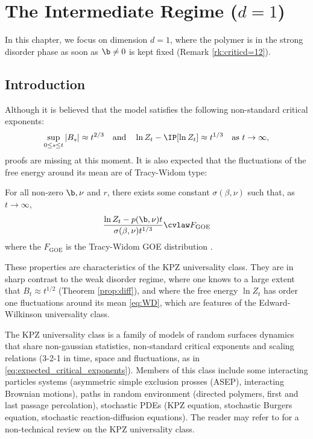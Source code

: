 \chapter{The Intermediate Regime ($d=1$)} \label{sec:IR}
In this chapter, we focus on dimension $d=1$, where the polymer is in the strong disorder phase as soon as $\b \neq 0$ is kept fixed (Remark \ref{rk:criticd=12}).
\section{Introduction}
Although it is believed that the model satisfies the following non-standard critical exponents: 
\begin{equation} \label{eq:expected_critical_exponents}
\sup_{0\leq s \leq t} |B_s| \approx t^{2/3} \quad \text{and} \quad \ln Z_t - \IP[\ln Z_t] \approx t^{1/3} \quad \text{as} \  t\to\infty,
\end{equation}
proofs are missing at this moment. It is also expected that the fluctuations of the free energy around its mean are of Tracy-Widom type:
\begin{conjecture} For all non-zero $\b,\nu$ and $r$, there exists some constant $\sigma(\beta,\nu)$ such that, as $t\to \infty$,
\begin{equation}
\frac{\ln Z_t-p(\b,\nu)t}{\sigma(\beta,\nu)t^{1/3}} \cvlaw F_{\mathrm{GOE}}
\end{equation}
where the $F_{\mathrm{GOE}}$ is the Tracy-Widom GOE distribution \textup{\cite{tracy1994level}}.
\end{conjecture}
These properties are characteristics of the KPZ universality class. They are in sharp contrast to the weak disorder regime, where one knows to a large extent that $B_t \approx t^{1/2}$ (Theorem \ref{prop:diff}), and where the free energy $\ln Z_t$ has order one fluctuations around its mean \eqref{eq:WD}, which are features of the Edward-Wilkinson universality class.

The KPZ universality class is a family of models of random surfaces dynamics that share non-gaussian statistics, non-standard critical exponents and scaling relations (3-2-1 in time, space and fluctuations, as in \eqref{eq:expected_critical_exponents}). Members of this class include some interacting particles systems (asymmetric simple exclusion prosses (ASEP), interacting Brownian motions), paths in random environment (directed polymers, first and last passage percolation), stochastic PDEs (KPZ equation, stochastic Burgers equation, stochastic reaction-diffusion equations). The reader may refer to \cite{corwin2016kardar} for a non-technical review on the KPZ universality class.

